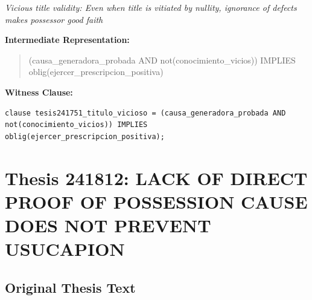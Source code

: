 \documentclass[11pt,a4paper]{article}
\begin{document}
\textit{Vicious title validity: Even when title is vitiated by nullity, ignorance of defects makes possessor good faith}

\textbf{Intermediate Representation:}

\begin{quote}
(causa\_generadora\_probada AND not(conocimiento\_vicios)) IMPLIES oblig(ejercer\_prescripcion\_positiva)
\end{quote}

\textbf{Witness Clause:}

\begin{lstlisting}[style=witnessstyle, language=Witness]
clause tesis241751_titulo_vicioso = (causa_generadora_probada AND not(conocimiento_vicios)) IMPLIES oblig(ejercer_prescripcion_positiva);
\end{lstlisting}

\newpage

\section{Thesis 241812: LACK OF DIRECT PROOF OF POSSESSION CAUSE DOES NOT PREVENT USUCAPION}
\label{thesis:241812}

\subsection{Original Thesis Text}
\end{document}
